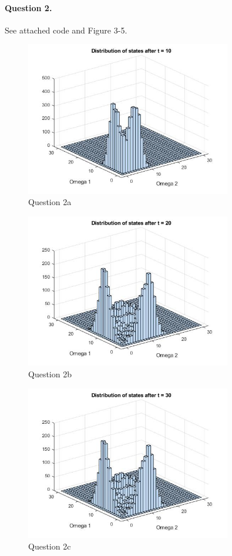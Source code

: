 \documentclass[11pt]{article}
\begin{document}
\paragraph{Question 2.}  See attached code and Figure 3-5.

\begin{figure}[!h]
	\centering
	\includegraphics[width=0.8\textwidth]{Figures/figure3.jpg}
	\caption{Question 2a}
\end{figure}

\begin{figure}[!h]
	\centering
	\includegraphics[width=0.8\textwidth]{Figures/figure4.jpg}
	\caption{Question 2b}
\end{figure}

\begin{figure}[!h]
	\centering
	\includegraphics[width=0.8\textwidth]{Figures/figure5.jpg}
	\caption{Question 2c}
\end{figure}
\end{document}
